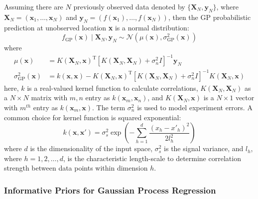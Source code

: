 Assuming there are $N$ previously observed data denoted by $\{\mathbf{X}_{N}, \mathbf{y}_{N}\}$, where $\mathbf{X}_{N} = (\mathbf{x}_{1}, \ldots, \mathbf{x}_{N})$ and $\mathbf{y}_{N} = \left(f(\mathbf{x}_{1}), \ldots, f(\mathbf{x}_{N})\right)$, then the GP probabilistic prediction at unobserved location \textbf{x} is a normal distribution:
\begin{equation}
\label{GP11}
f_{\textrm{GP}}(\mathbf{x}) \mid \mathbf{X}_{N}, \mathbf{y}_{N} \sim \mathcal{N}\left(\mu(\mathbf{x}),\sigma_{\textrm{GP}}^2(\mathbf{x})\right)
\end{equation}
where
\begin{equation}
\begin{aligned}
\label{meancov}
\mu(\mathbf{x}) &= K(\mathbf{X}_{N},\mathbf{x})^\textrm{T}[K(\mathbf{X}_{N},\mathbf{X}_{N})+\sigma^2_{n}I]^{-1} \mathbf{y}_{N}\\
\sigma_{\textrm{GP}}^2 (\mathbf{x})  &=  k(\mathbf{x},\mathbf{x}) - K(\mathbf{X}_{N},\mathbf{x})^\textrm{T} [K(\mathbf{X}_{N},\mathbf{X}_{N})+\sigma^2_{n}I]^{-1}K(\mathbf{X}_{N},\mathbf{x})
\end{aligned}
\end{equation}
here, $k$ is a real-valued kernel function to calculate correlations, $K(\mathbf{X}_{N},\mathbf{X}_{N})$ as a $N \times N$ matrix with $m,n$ entry as $k(\mathbf{x}_{m}, \mathbf{x}_{n})$, and $K(\mathbf{X}_{N}, \mathbf{x})$ is a $N \times 1$ vector with $m^{th}$ entry as $k(\mathbf{x}_{m}, \mathbf{x})$.  The term $\sigma^2_{n}$ is used to model experiment errors. A common choice for kernel function is squared exponential:
\begin{equation}
\label{eq:5}
k(\mathbf{x},\mathbf{x'}) = \sigma_s^2 \exp\left(- \sum_{h = 1}^{d} \frac {(x_h-x'_h)^2}{2l_h^2}\right )
\end{equation}
where $d$ is the dimensionality of the input space, $\sigma_s^2$ is the signal variance, and $l_h$, where $h = 1,2,\ldots,d$, is the characteristic length-scale to determine correlation strength between data points within dimension $h$.

\subsubsection{Informative Priors for Gaussian Process Regression}

